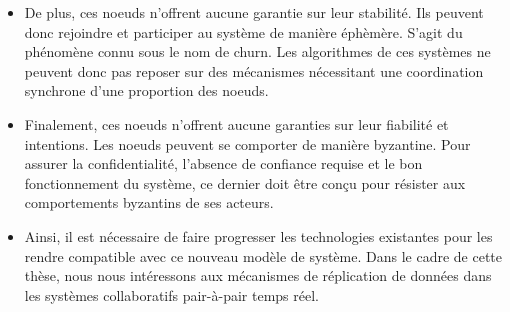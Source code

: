 \begin{itemize}
    \item De plus, ces noeuds n'offrent aucune garantie sur leur stabilité.
      Ils peuvent donc rejoindre et participer au système de manière éphèmère.
      S'agit du phénomène connu sous le nom de churn.
      Les algorithmes de ces systèmes ne peuvent donc pas reposer sur des mécanismes nécessitant une coordination synchrone d'une proportion des noeuds.
    \item Finalement, ces noeuds n'offrent aucune garanties sur leur fiabilité et intentions.
      Les noeuds peuvent se comporter de manière byzantine.
      Pour assurer la confidentialité, l'absence de confiance requise et le bon fonctionnement du système, ce dernier doit être conçu pour résister aux comportements byzantins de ses acteurs.
    \item Ainsi, il est nécessaire de faire progresser les technologies existantes pour les rendre compatible avec ce nouveau modèle de système.
      Dans le cadre de cette thèse, nous nous intéressons aux mécanismes de réplication de données dans les systèmes collaboratifs pair-à-pair temps réel.
\end{itemize}
